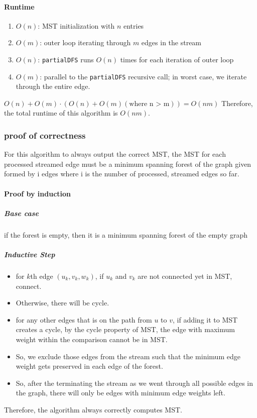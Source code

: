 \documentclass[11pt]{article}
\begin{document}
\hypertarget{runtime}{%
\paragraph{Runtime}\label{runtime}}

\begin{enumerate}
\def\labelenumi{\arabic{enumi}.}
\item
  \(O(n)\): MST initialization with \(n\) entries
\item
  \(O(m)\): outer loop iterating through \(m\) edges in the stream
\item
  \(O(n)\): \texttt{partialDFS} runs \(O(n)\) times for each iteration
  of outer loop
\item
  \(O(m)\): parallel to the \texttt{partialDFS} recursive call; in worst
  case, we iterate through the entire edge.
\end{enumerate}

\(O(n) + O(m) \cdot (O(n) + O(m) (\text{where n > m})) = O(nm)\)
Therefore, the total runtime of this algorithm is \(O(nm)\).

\hypertarget{proof-of-correctness-1}{%
\subsubsection{proof of correctness}\label{proof-of-correctness-1}}

For this algorithm to always output the correct MST, the MST for each
processed streamed edge must be a minimum spanning forest of the graph
given formed by i edges where i is the number of processed, streamed
edges so far.

\hypertarget{proof-by-induction}{%
\paragraph{Proof by induction}\label{proof-by-induction}}

\hypertarget{base-case}{%
\subparagraph{Base case}\label{base-case}}

if the forest is empty, then it is a minimum spanning forest of the
empty graph

\hypertarget{inductive-step}{%
\subparagraph{Inductive Step}\label{inductive-step}}

\begin{itemize}
\item
  for \(k\)th edge \((u_k, v_k, w_k)\), if \(u_k\) and \(v_k\) are not
  connected yet in MST, connect.
\item
  Otherwise, there will be cycle.
\item
  for any other edges that is on the path from \(u\) to \(v\), if adding
  it to MST creates a cycle, by the cycle property of MST, the edge with
  maximum weight within the comparison cannot be in MST.
\item
  So, we exclude those edges from the stream such that the minimum edge
  weight gets preserved in each edge of the forest.
\item
  So, after the terminating the stream as we went through all possible
  edges in the graph, there will only be edges with minimum edge weights
  left.
\end{itemize}

Therefore, the algorithm always correctly computes MST.
\end{document}
